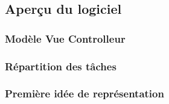 \subsection{Aperçu du logiciel}
\subsubsection{Modèle Vue Controlleur}
\subsubsection{Répartition des tâches}
\subsubsection{Première idée de représentation}


